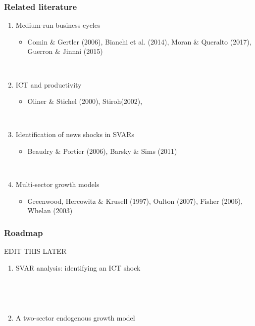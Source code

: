 \documentclass{beamer}
\begin{document}

\begin{frame}
	\frametitle{Related literature}
	
	\begin{enumerate}
	\item Medium-run business cycles 
		\begin{itemize}
		\item Comin \& Gertler (2006), Bianchi et al. (2014), Moran \& Queralto (2017), Guerron \& Jinnai (2015)
		\end{itemize}

	
	\
	
	\item ICT and productivity 
		\begin{itemize}
		\item Oliner \& Stichel (2000), Stiroh(2002), 
		\end{itemize}
	
	\
	
	\item Identification of news shocks in SVARs
		\begin{itemize}
		\item Beaudry \& Portier (2006), Barsky \& Sims (2011)
		\end{itemize}
	
	\
	
	\item Multi-sector growth models
		\begin{itemize}
		\item Greenwood, Hercowitz \& Krusell (1997), Oulton (2007), Fisher (2006), Whelan (2003)
		\end{itemize}
	\end{enumerate}

	
\end{frame}

\begin{frame}
\frametitle{Roadmap}

EDIT THIS LATER
\begin{enumerate} 
	\item SVAR analysis: identifying an ICT shock
	
	\
	
	\
	
	\item A two-sector endogenous growth model
	 
	\
	
\end{enumerate} 

\end{frame}
\end{document}
